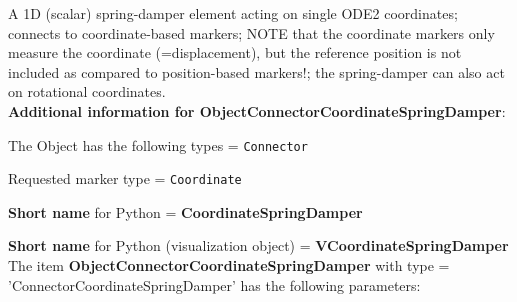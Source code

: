 %
\newpage

\label{sec:item:ObjectConnectorCoordinateSpringDamper}
A 1D (scalar) spring-damper element acting on single ODE2 coordinates; connects to coordinate-based markers; NOTE that the coordinate markers only measure the coordinate (=displacement), but the reference position is not included as compared to position-based markers!; the spring-damper can also act on rotational coordinates.\vspace{12pt}
 \\{\bf Additional information for ObjectConnectorCoordinateSpringDamper}:
\bi
  \item The Object has the following types = \texttt{Connector}
  \item Requested marker type = \texttt{Coordinate}
  \item {\bf Short name} for Python = {\bf CoordinateSpringDamper}  \item {\bf Short name} for Python (visualization object) = {\bf VCoordinateSpringDamper}\ei
\vspace{12pt} \noindent The item {\bf ObjectConnectorCoordinateSpringDamper} with type = 'ConnectorCoordinateSpringDamper' has the following parameters:\vspace{-1cm}\\ 
